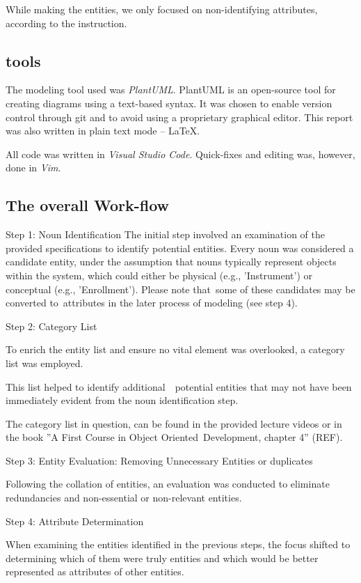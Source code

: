 \documentclass[a4paper]{scrartcl}
\begin{document}
While making the entities, we only focused on non-identifying attributes, according to the instruction. 

\subsection*{tools}
The modeling tool used was \emph{PlantUML}.
PlantUML is an open-source tool for creating diagrams using a text-based
syntax.
It was chosen to enable version control through git and to avoid using a
proprietary graphical editor.
This report was also written in plain text mode -- \LaTeX.

All code was written in \emph{Visual Studio Code}.
Quick-fixes and editing was, however, done in \emph{Vim}.

\subsection*{The overall Work-flow}

Step 1: Noun Identification The initial step involved an examination of the provided specifications to identify potential entities. Every noun was considered a candidate entity, under the assumption that nouns typically represent objects within the system, which could either be physical (e.g., 'Instrument') or conceptual (e.g., 'Enrollment'). Please note that some of these candidates may be converted to attributes in the later process of modeling (see step 4).

Step 2: Category List  

To enrich the entity list and ensure no vital element was overlooked, a category list was employed. 

This list helped to identify additional  potential entities that may not have been immediately evident from the noun identification step. 

The category list in question, can be found in the provided lecture videos or in the book ''A First Course in Object Oriented Development, chapter 4'' (REF).

Step 3: Entity Evaluation: Removing Unnecessary Entities or duplicates

Following the collation of entities, an evaluation was conducted to eliminate redundancies and non-essential or non-relevant entities. 

Step 4: Attribute Determination 

When examining the entities identified in the previous steps, the focus shifted to determining which of them were truly entities and which would be better represented as attributes of other entities. 
\end{document}
